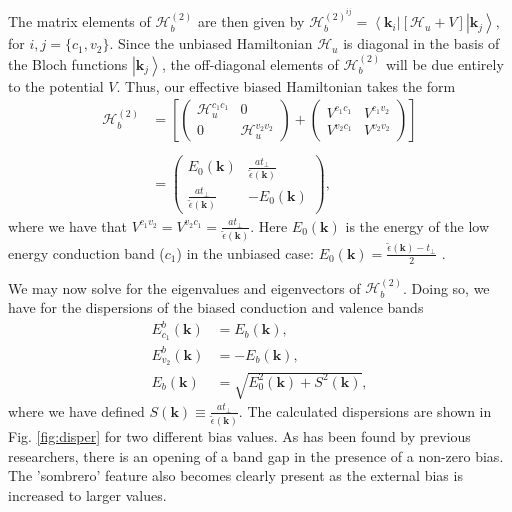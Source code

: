 \documentclass[twocolumn,secnumarabic,amssymb, nobibnotes, aps, prd, superscriptaddress]{revtex4-1}
\begin{document}
The matrix elements of $\mathcal{H}_{b}^{(2)}$ are then given by $\mathcal{H}_{b}^{{(2)}^{ij}}=\left\langle \mathbf{k}_{i}\right|\left[\mathcal{H}_{u}+V\right]\left|\mathbf{k}_{j}\right\rangle,$ for $i,j=\{c_{1},v_{2}\}$. Since the unbiased Hamiltonian $\mathcal{H}_{u}$ is diagonal in the basis of the Bloch functions $\left|\mathbf{k}_{j}\right\rangle$, the off-diagonal elements of $\mathcal{H}_{b}^{(2)}$ will be due entirely to the potential $V$. Thus, our effective biased Hamiltonian takes the form
\begin{equation}
\begin{aligned}\mathcal{H}_{b}^{(2)} & =\left[\left(\begin{array}{cc}
\mathcal{H}_{u}^{c_{1}c_{1}} & 0\\
0 & \mathcal{H}_{u}^{v_{2}v_{2}}
\end{array}\right)+\left(\begin{array}{cc}
V^{c_{1}c_{1}} & V^{c_{1}v_{2}}\\
V^{v_{2}c_{1}} & V^{v_{2}v_{2}}
\end{array}\right)\right]\\
\\
 & =\left(\begin{array}{cc}
E_{0}(\mathbf{k}) & \frac{at_{\perp}}{\tilde{\epsilon}(\mathbf{k})}\\
\frac{at_{\perp}}{\tilde{\epsilon}(\mathbf{k})} & -E_{0}(\mathbf{k})
\end{array}\right),
\end{aligned}\label{eq:hameff}
 \end{equation}
where we have that $V^{c_{1}v_{2}}=V^{v_{2}c_{1}}=\frac{at_{\perp}}{\tilde{\epsilon}(\mathbf{k})}$. Here $E_{0}(\mathbf{k})$ is the energy of the low energy conduction band ($c_{1}$) in the unbiased case: $E_{0}(\mathbf{k})=\frac{\tilde{\epsilon}(\mathbf{k})-t_{\perp}}{2}$ \cite{mcgouran2016nonlinear}.  

We may now solve for the eigenvalues and eigenvectors of $\mathcal{H}_{b}^{(2)}$. Doing so, we have for the dispersions of the biased conduction and valence bands
\begin{equation}
\begin{aligned}E_{c_{1}}^{b}(\mathbf{k}) & =E_{b}(\mathbf{k}),\\
E_{v_{2}}^{b}(\mathbf{k}) & =-E_{b}(\mathbf{k}),\\
E_{b}(\mathbf{k}) & =\sqrt{E_{0}^{2}(\mathbf{k})+S^{2}(\mathbf{k})},
\end{aligned}\label{eq:disper}
\end{equation}
where we have defined $S(\mathbf{k})\equiv \frac{at_{\perp}}{\tilde{\epsilon}(\mathbf{k})}.$
The calculated dispersions are shown in Fig. \ref{fig:disper} for two different bias values. As has been found by previous researchers\cite{mccann2006asymmetry, neto2009electronic}, there is an opening of a band gap in the presence of a non-zero bias. The 'sombrero' feature also becomes clearly present as the external bias is increased to larger values.
\end{document}
